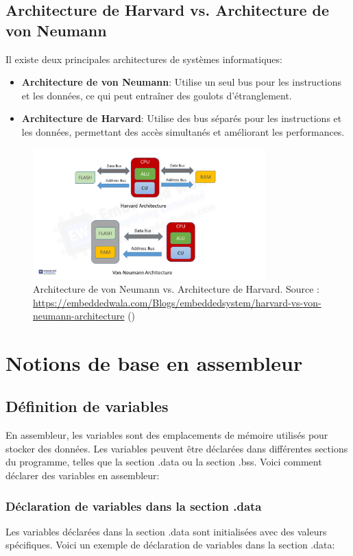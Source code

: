 \documentclass[a4paper, 12pt]{report}
\begin{document}
\section{Architecture de Harvard vs. Architecture de von Neumann}
Il existe deux principales architectures de systèmes informatiques:
\begin{itemize}
  \item \textbf{Architecture de von Neumann}: Utilise un seul bus pour les instructions et les données, ce qui peut entraîner des goulots d'étranglement.
  \item \textbf{Architecture de Harvard}: Utilise des bus séparés pour les instructions et les données, permettant des accès simultanés et améliorant les performances.
\end{itemize}

\begin{figure}[H]
  \centering
  \includegraphics[width=0.8\textwidth]{imgs/neumann.jpg}
  \caption{Architecture de von Neumann vs. Architecture de Harvard. Source : \url{https://embeddedwala.com/Blogs/embeddedsystem/harvard-vs-von-neumann-architecture} (\cite{6})}
\end{figure}

\chapter{Notions de base en assembleur}

\section{Définition de variables}
En assembleur, les variables sont des emplacements de mémoire utilisés pour stocker des données. Les variables peuvent être déclarées dans différentes sections du programme, telles que la section .data ou la section .bss. Voici comment déclarer des variables en assembleur:

\subsection{Déclaration de variables dans la section .data}
Les variables déclarées dans la section .data sont initialisées avec des valeurs spécifiques. Voici un exemple de déclaration de variables dans la section .data:
\end{document}
